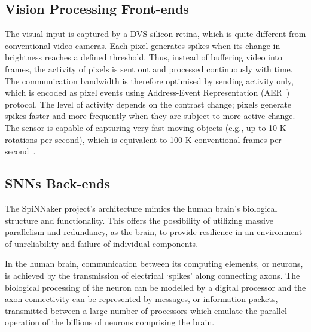 \subsection{Vision Processing Front-ends}
The visual input is captured by a DVS silicon retina, which is quite different from conventional video cameras.
Each pixel generates spikes when its change in brightness reaches a defined threshold.
Thus, instead of buffering video into frames, the activity of pixels is sent out and processed continuously with time.
The communication bandwidth is therefore optimised by sending activity only, which is encoded as pixel events using Address-Event Representation (AER~\cite{lazzaro1995multi}) protocol.
The level of activity depends on the contrast change; pixels generate spikes faster and more frequently when they are subject to more active change.
The sensor is capable of capturing very fast moving objects (e.g., up to 10 K rotations per second), which is equivalent to 100 K conventional frames per second~\cite{lenero20113}.

\subsection{SNNs Back-ends}
The SpiNNaker project's architecture mimics the human brain's biological structure and functionality. 
This offers the possibility of utilizing massive parallelism and redundancy, as the brain, to provide resilience in an environment of unreliability and failure of individual components.

In the human brain, communication between its computing elements, or neurons, is achieved by the transmission of electrical `spikes' along connecting axons. 
The biological processing of the neuron can be modelled by a digital processor and the axon connectivity can be represented by messages, or information packets, transmitted between a large number of processors which emulate the parallel operation of the billions of neurons comprising the brain.

